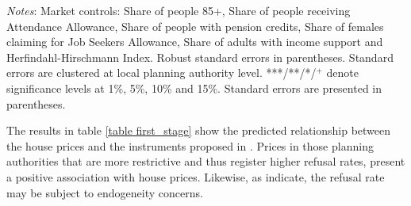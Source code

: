 \documentclass[12pt,letterpaper]{article}
\begin{document}
\begin{table}[h]
\centering
\caption{First stage results, dependent variable house prices (log)}
\label{table first_stage}
\begin{tablenotes}
      \scriptsize
      \item {\it{Notes}}: Market controls: Share of people 85+, 
      Share of people receiving Attendance Allowance, Share of people with pension credits, 
      Share of females claiming for Job Seekers Allowance, Share of adults with income support and
      Herfindahl-Hirschmann Index. Robust standard errors in parentheses. Standard errors are clustered at local planning 
      authority level. ***/**/*/$^{+}$ denote significance levels at 1\%, 5\%, 
      10\% and 15\%. Standard errors are presented in parentheses. 
    \end{tablenotes}
\end{table}


The results in table \ref{table first_stage}  show the predicted relationship between the house 
prices and the instruments proposed in \citep{hilber2016supply}. Prices in those planning authorities that are more 
restrictive and thus register higher refusal rates, present a positive 
association with house prices. Likewise, as \citet{hilber2016supply} indicate, 
the refusal rate may be subject to endogeneity concerns. 
\end{document}
